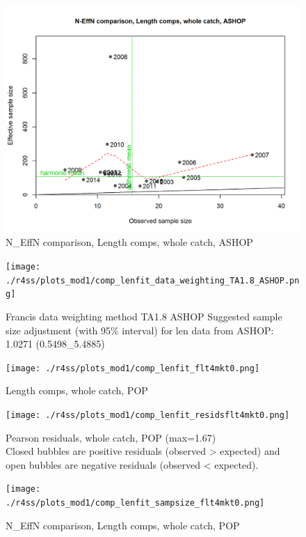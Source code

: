 \documentclass[12pt,]{article}
\begin{document}
\begin{figure}
\centering
\includegraphics{./r4ss/plots_mod1/comp_lenfit_sampsize_flt2mkt0.png}
\caption{N\_EffN comparison, Length comps, whole catch, ASHOP
\label{fig:mod1_12_comp_lenfit_sampsize_flt2mkt0}}
\end{figure}

\begin{figure}
\centering
\texttt{[image: ./r4ss/plots\_mod1/comp\_lenfit\_data\_weighting\_TA1.8\_ASHOP.png]}
\caption{Francis data weighting method TA1.8 ASHOP Suggested sample size
adjustment (with 95\% interval) for len data from ASHOP: 1.0271
(0.5498\_5.4885)
\label{fig:mod1_13_comp_lenfit_data_weighting_TA1.8_ASHOP}}
\end{figure}

\begin{figure}
\centering
\texttt{[image: ./r4ss/plots\_mod1/comp\_lenfit\_flt4mkt0.png]}
\caption{Length comps, whole catch, POP
\label{fig:mod1_14_comp_lenfit_flt4mkt0}}
\end{figure}

\begin{figure}
\centering
\texttt{[image: ./r4ss/plots\_mod1/comp\_lenfit\_residsflt4mkt0.png]}
\caption{Pearson residuals, whole catch, POP (max=1.67)\\
Closed bubbles are positive residuals (observed \textgreater{} expected)
and open bubbles are negative residuals (observed \textless{} expected).
\label{fig:mod1_15_comp_lenfit_residsflt4mkt0}}
\end{figure}

\begin{figure}
\centering
\texttt{[image: ./r4ss/plots\_mod1/comp\_lenfit\_sampsize\_flt4mkt0.png]}
\caption{N\_EffN comparison, Length comps, whole catch, POP
\label{fig:mod1_16_comp_lenfit_sampsize_flt4mkt0}}
\end{figure}
\end{document}
